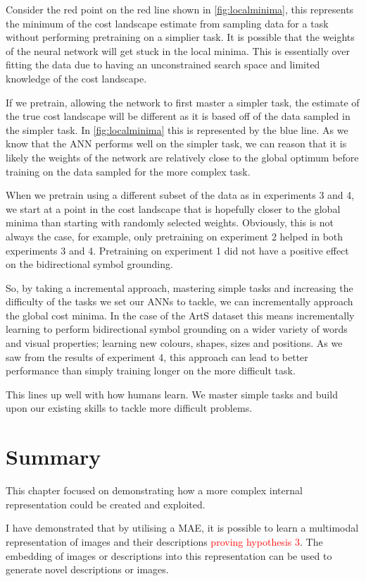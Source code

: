 Consider the red point on the red line shown in \autoref{fig:localminima}, this represents the minimum of the cost landscape estimate from sampling data for a task without performing pretraining on a simplier task. It is possible that the weights of the neural network will get stuck in the local minima. This is essentially over fitting the data due to having an unconstrained search space and limited knowledge of the cost landscape.

If we pretrain, allowing the network to first master a simpler task, the estimate of the true cost landscape will be different as it is based off of the data sampled in the simpler task. In \autoref{fig:localminima} this is represented by the blue line. As we know that the \ac{ANN} performs well on the simpler task, we can reason that it is likely the weights of the network are relatively close to the global optimum before training on the data sampled for the more complex task.


When we pretrain using a different subset of the data as in experiments 3 and 4, we start at a point in the cost landscape that is hopefully closer to the global minima than starting with randomly selected weights. Obviously, this is not always the case, for example, only pretraining on experiment 2 helped in both experiments 3 and 4. Pretraining on experiment 1 did not have a positive effect on the bidirectional symbol grounding.

So, by taking a incremental approach, mastering simple tasks and increasing the difficulty of the tasks we set our  \acp{ANN} to tackle, we can incrementally approach the global cost minima. In the case of the ArtS dataset this means incrementally learning to perform bidirectional symbol grounding on a wider variety of words and visual properties; learning new colours, shapes, sizes and positions. As we saw from the results of experiment 4, this approach can lead to better performance than simply training longer on the more difficult task.

This lines up well with how humans learn. We master simple tasks and build upon our existing skills to tackle more difficult problems.

\section{Summary}
This chapter focused on demonstrating how a more complex internal representation could be created and exploited.

I have demonstrated that by utilising a \ac{MAE}, it is possible to learn a multimodal representation of images and their descriptions \textcolor{red}{proving hypothesis 3}. The embedding of images or descriptions into this representation can be used to generate novel descriptions or images.

